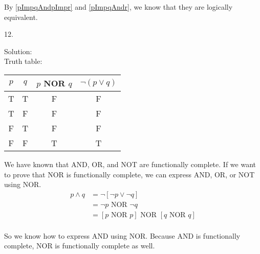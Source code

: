 \documentclass[12pt]{article}
\begin{document}
By \ref{pImpqAndpImpr} and \ref{pImpqAndr}, we know that they are logically equivalent.
\newline

12. 

\indent Solution:\\
\indent Truth table:\\
\begin{center}
\begin{tabular}{c|c|c|c}
    $p$ & $q$ & $p $ NOR $ q$ & $\lnot (p \lor q)$ \\
\hline
T & T & F & F\\
T & F & F & F\\
F & T & F & F\\
F & F & T & T
\end{tabular}
\end{center}

\indent We have known that AND, OR, and NOT are functionally complete. If we want to prove that NOR is functionally complete, we can express AND, OR, or NOT using NOR.\\

\begin{align*}
p \land q &= \lnot [\lnot p \lor \lnot q] \\
          &= \lnot p \text{ NOR } \lnot q \\
          &= [p \text{ NOR } p] \text{ NOR } [q \text{ NOR } q] \\
\end{align*}

\indent So we know how to express AND using NOR. Because AND is functionally complete, NOR is functionally complete as well. \\
\end{document}

